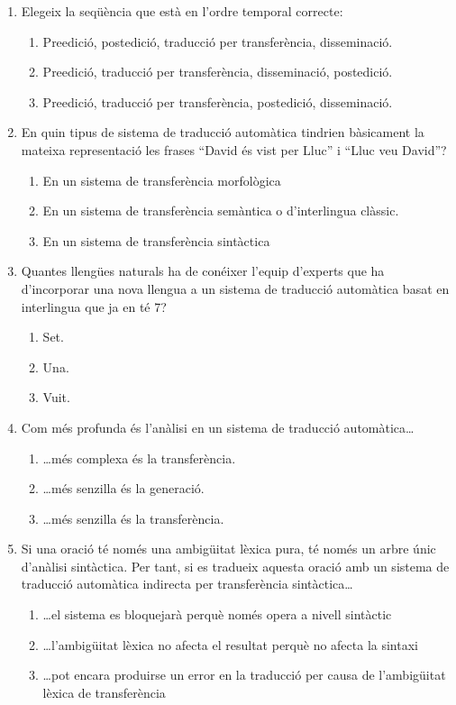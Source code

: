\begin{enumerate}
\item Elegeix la seqüència que està en l'ordre temporal correcte:
  \begin{enumerate}
  \item Preedició, postedició, traducció per transferència,
    disseminació.
  \item Preedició, traducció per transferència, disseminació,
    postedició.
  \item Preedició, traducció per transferència, postedició,
    disseminació.
\end{enumerate}

\item En quin tipus de sistema de traducció automàtica tindrien
  bàsicament la mateixa representació les frases ``David és vist per
  Lluc'' i ``Lluc veu David''?  
  \begin{enumerate}
  \item En un sistema de transferència morfològica
  \item En un sistema de transferència semàntica o d'interlingua
    clàssic.
  \item En un sistema de transferència sintàctica
  \end{enumerate}

\item Quantes llengües naturals ha de conéixer l'equip d'experts que
  ha d'incorporar una nova llengua a un sistema de traducció
  automàtica basat en interlingua que ja en té 7?   
  \begin{enumerate}
  \item Set.
  \item Una.
  \item Vuit.
  \end{enumerate}

\item Com més profunda és l'anàlisi en un sistema de traducció
  automàtica{\ldots}   
  \begin{enumerate}
  \item {\ldots}més complexa és la transferència.
  \item {\ldots}més senzilla és la generació.
  \item {\ldots}més senzilla és la transferència.
  \end{enumerate}

\item Si una oració té només una ambigüitat lèxica pura, té només un
  arbre únic d'anàlisi sintàctica. Per tant, si es tradueix aquesta
  oració amb un sistema de traducció automàtica indirecta per
  transferència sintàctica{\ldots}
  \begin{enumerate}
  \item {\ldots}el sistema es bloquejarà perquè només opera a nivell
    sintàctic
  \item {\ldots}l'ambigüitat lèxica no afecta el resultat perquè no
    afecta la sintaxi
  \item {\ldots}pot encara produirse un error en la traducció per
    causa de l'ambigüitat lèxica de transferència
  \end{enumerate}


\end{enumerate}

